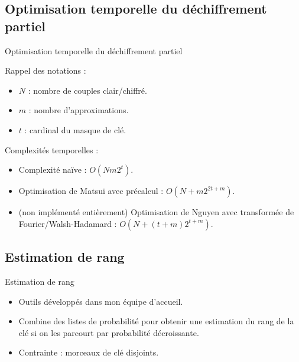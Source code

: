 \documentclass{beamer}
\begin{document}
\subsection{Optimisation temporelle du déchiffrement partiel}
\begin{frame}{Optimisation temporelle du déchiffrement partiel}

Rappel des notations :
	\begin{itemize}
		\item $N$ : nombre de couples clair/chiffré.
		\item $m$ : nombre d'approximations.
		\item $t$ : cardinal du masque de clé.
	\end{itemize}

Complexités temporelles :
\begin{itemize}
	\item Complexité naïve : $O(Nm2^t)$.
	\item Optimisation de Matsui avec précalcul : $O(N+m2^{2t+m})$.
	\item (non implémenté entièrement) Optimisation de Nguyen avec transformée de Fourier/Walsh-Hadamard : $O(N+(t+m)2^{t+m})$.
\end{itemize}
\end{frame}

\subsection{Estimation de rang}
\begin{frame}{Estimation de rang}
	\begin{itemize}
		\item Outils développés dans mon équipe d'accueil.
		\item Combine des listes de probabilité pour obtenir une estimation du rang de la clé
		si on les parcourt par probabilité décroissante.
		\item Contrainte : morceaux de clé disjoints.
	\end{itemize}
\end{frame}
\end{document}
